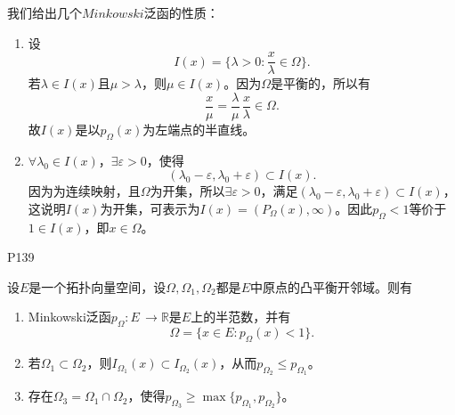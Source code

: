 \original
{
	我们给出几个$Minkowski$泛函的性质：
	\begin{enumerate}
		\item 设
		\begin{equation*}
			I(x)=\{\lambda>0:\frac{x}{\lambda}\in \Omega\}.
		\end{equation*}
	若$\lambda\in I(x) $且$\mu >\lambda $，则$\mu \in I(x) $。因为$\Omega $是平衡的，所以有
	\begin{equation*}
		\frac{x}{\mu}=\frac{\lambda}{\mu}\, \frac{x}{\lambda}\in \Omega.
	\end{equation*}
	故$I(x) $是以$p_{\Omega}(x) $为左端点的半直线。
	
	\item $\forall \lambda_{0}\in I(x) $，$\exists \varepsilon>0 $，使得
	\begin{equation*}
		(\lambda_{0}-\varepsilon,\lambda_{0}+\varepsilon)\subset I(x).
	\end{equation*}
	因为为连续映射，且$\Omega $为开集，所以$\exists \varepsilon>0 $，满足$(\lambda_{0}-\varepsilon,\lambda_{0}+\varepsilon ) \subset I(x)$，这说明$I(x) $为开集，可表示为$I(x)=(P_{\Omega}(x),\infty) $。因此$p_{\Omega}<1 $等价于$1\in I(x) $，即$x\in \Omega $。
	\end{enumerate}
}
{P139}

\begin{theorem}\label{XQHthe070302}
	设$E$是一个拓扑向量空间，设$\Omega,\Omega_{1},\Omega_{2} $都是$E $中原点的凸平衡开邻域。则有
	\begin{enumerate}
		\item Minkowski泛函$p_{\Omega}:E\, \rightarrow \mathbb{R} $是$E$上的半范数，并有
		\begin{equation*}
			\Omega=\{x\in E:p_{\Omega}(x)<1\}.
		\end{equation*}
		
		\item 若$\Omega_{1}\subset \Omega_{2} $，则$I_{\Omega_{1}}(x)\subset I_{\Omega_{2}}(x) $，从而$p_{\Omega_{2}}\leq p_{\Omega_{1}} $。
		
		\item 存在$\Omega_{3}=\Omega_{1}\cap\Omega_{2} $，使得$p_{\Omega_{3}}\geq \max \{p_{\Omega_{1}},p_{\Omega_{2}}\} $。
	\end{enumerate}
\end{theorem}

